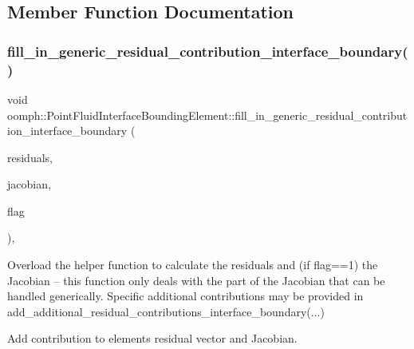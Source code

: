 \subsection{Member Function Documentation}
\mbox{\label{classoomph_1_1PointFluidInterfaceBoundingElement_aad95a7d6f4e4349ee1136e623aa69c88}} 
\subsubsection{\texorpdfstring{fill\+\_\+in\+\_\+generic\+\_\+residual\+\_\+contribution\+\_\+interface\+\_\+boundary()}{fill\_in\_generic\_residual\_contribution\_interface\_boundary()}}
{\footnotesize\ttfamily void oomph\+::\+Point\+Fluid\+Interface\+Bounding\+Element\+::fill\+\_\+in\+\_\+generic\+\_\+residual\+\_\+contribution\+\_\+interface\+\_\+boundary (\begin{DoxyParamCaption}\item[{\hyperlink{classoomph_1_1Vector}{Vector}$<$ double $>$ \&}]{residuals,  }\item[{\hyperlink{classoomph_1_1DenseMatrix}{Dense\+Matrix}$<$ double $>$ \&}]{jacobian,  }\item[{unsigned}]{flag }\end{DoxyParamCaption})\hspace{0.3cm}{\ttfamily [protected]}, {\ttfamily [virtual]}}



Overload the helper function to calculate the residuals and (if flag==1) the Jacobian -- this function only deals with the part of the Jacobian that can be handled generically. Specific additional contributions may be provided in add\+\_\+additional\+\_\+residual\+\_\+contributions\+\_\+interface\+\_\+boundary(...) 

Add contribution to element\textquotesingle{}s residual vector and Jacobian. 

